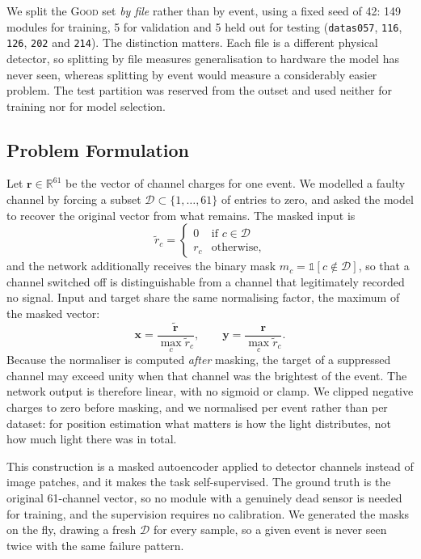 \documentclass[10pt,conference]{IEEEtran}
\begin{document}
We split the \textsc{Good} set \emph{by file} rather than by event, using a
fixed seed of 42: 149 modules for training, 5 for validation and 5 held out for
testing (\texttt{datas057}, \texttt{116}, \texttt{126}, \texttt{202} and
\texttt{214}). The distinction matters. Each file is a different physical
detector, so splitting by file measures generalisation to hardware the model
has never seen, whereas splitting by event would measure a considerably easier
problem. The test partition was reserved from the outset and used neither for
training nor for model selection.

\subsection{Problem Formulation}
\label{sec:formulation}

Let $\mathbf{r} \in \mathbb{R}^{61}$ be the vector of channel charges for one
event. We modelled a faulty channel by forcing a subset
$\mathcal{D} \subset \{1, \dots, 61\}$ of entries to zero, and asked the model
to recover the original vector from what remains. The masked input is
%
\begin{equation}
\tilde{r}_{c} =
\begin{cases}
0 & \text{if } c \in \mathcal{D} \\
r_{c} & \text{otherwise,}
\end{cases}
\label{eq:mask}
\end{equation}
%
and the network additionally receives the binary mask
$m_{c} = \mathbb{1}[c \notin \mathcal{D}]$, so that a channel switched off is
distinguishable from a channel that legitimately recorded no signal. Input and
target share the same normalising factor, the maximum of the masked vector:
%
\begin{equation}
\mathbf{x} = \frac{\tilde{\mathbf{r}}}{\max_{c} \tilde{r}_{c}},
\qquad
\mathbf{y} = \frac{\mathbf{r}}{\max_{c} \tilde{r}_{c}}.
\label{eq:norm}
\end{equation}
%
Because the normaliser is computed \emph{after} masking, the target of a
suppressed channel may exceed unity when that channel was the brightest of the
event. The network output is therefore linear, with no sigmoid or clamp. We
clipped negative charges to zero before masking, and we normalised per event
rather than per dataset: for position estimation what matters is how the light
distributes, not how much light there was in total.

This construction is a masked autoencoder \cite{he2022mae} applied to detector
channels instead of image patches, and it makes the task self-supervised. The
ground truth is the original 61-channel vector, so no module with a genuinely
dead sensor is needed for training, and the supervision requires no
calibration. We generated the masks on the fly, drawing a fresh $\mathcal{D}$
for every sample, so a given event is never seen twice with the same failure
pattern.
\end{document}
